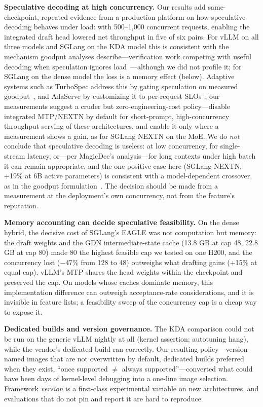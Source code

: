 \documentclass[11pt]{article}
\begin{document}
\textbf{Speculative decoding at high concurrency.} Our results add same-checkpoint, repeated evidence from a production platform on how speculative decoding behaves under load: with 500--1,000 concurrent requests, enabling the integrated draft head lowered net throughput in five of six pairs. For vLLM on all three models and SGLang on the KDA model this is consistent with the mechanism goodput analyses describe---verification work competing with useful decoding when speculation ignores load~\cite{liu2024turbospec}---although we did not profile it; for SGLang on the dense model the loss is a memory effect (below). Adaptive systems such as TurboSpec address this by gating speculation on measured goodput~\cite{liu2024turbospec}, and AdaServe by customizing it to per-request SLOs~\cite{li2025adaserve}; our measurements suggest a cruder but zero-engineering-cost policy---disable integrated MTP/NEXTN by default for short-prompt, high-concurrency throughput serving of these architectures, and enable it only where a measurement shows a gain, as for SGLang NEXTN on the MoE. We do \emph{not} conclude that speculative decoding is useless: at low concurrency, for single-stream latency, or---per MagicDec's analysis---for long contexts under high batch~\cite{sadhukhan2024magicdec} it can remain appropriate, and the one positive case here (SGLang NEXTN, +19\% at 6B active parameters) is consistent with a model-dependent crossover, as in the goodput formulation~\cite{liu2024turbospec}. The decision should be made from a measurement at the deployment's own concurrency, not from the feature's reputation.

\textbf{Memory accounting can decide speculative feasibility.} On the dense hybrid, the decisive cost of SGLang's EAGLE was not computation but memory: the draft weights and the GDN intermediate-state cache (13.8 GB at cap 48, 22.8 GB at cap 80) made 80 the highest feasible cap we tested on one H200, and the concurrency lost ($-$47\% from 128 to 48) outweighs what drafting gains (+15\% at equal cap). vLLM's MTP shares the head weights within the checkpoint and preserved the cap. On models whose caches dominate memory, this implementation difference can outweigh acceptance-rate considerations, and it is invisible in feature lists; a feasibility sweep of the concurrency cap is a cheap way to expose it.

\textbf{Dedicated builds and version governance.} The KDA comparison could not be run on the generic vLLM nightly at all (kernel assertion; autotuning hang), while the vendor's dedicated build ran correctly. Our resulting policy---version-named images that are not overwritten by default, dedicated builds preferred when they exist, ``once supported $\ne$ always supported''---converted what could have been days of kernel-level debugging into a one-line image selection. Framework \emph{version} is a first-class experimental variable on new architectures, and evaluations that do not pin and report it are hard to reproduce.
\end{document}
